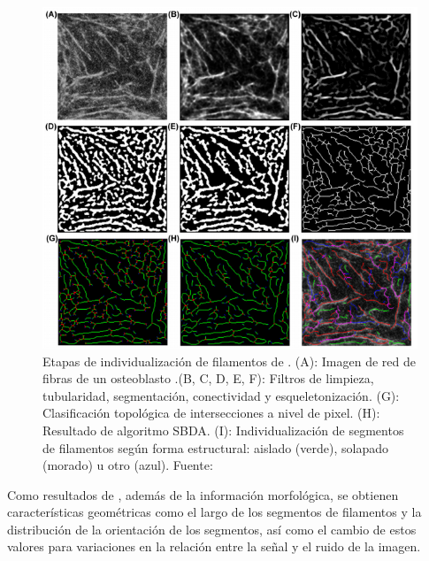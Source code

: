 \begin{figure}[H]
        \centering
        \includegraphics[scale=0.75]{imagenes/QuantitativeIFS.png}
        \caption{Etapas de individualizaci\'on de filamentos de \cite{qiu2014quantitative}. (A): Imagen de red de fibras de un osteoblasto .(B, C, D, E, F): Filtros de limpieza, tubularidad, segmentaci\'on, conectividad y esqueletonizaci\'on. (G): Clasificaci\'on topol\'ogica de intersecciones a nivel de pixel. (H): Resultado de algoritmo SBDA. (I): Individualizaci\'on de segmentos de filamentos seg\'un forma estructural: aislado (verde), solapado (morado) u otro (azul). Fuente: \cite{qiu2014quantitative}}
        \label{fig:IFS}
\end{figure}

Como resultados de \cite{qiu2014quantitative}, adem\'as de la informaci\'on morfol\'ogica, se obtienen caracter\'isticas geom\'etricas como el largo de los segmentos de  filamentos y la distribuci\'on de la orientaci\'on de los segmentos, as\'i como el cambio de estos valores para variaciones en la relaci\'on entre la se\~nal y el ruido de la imagen.

